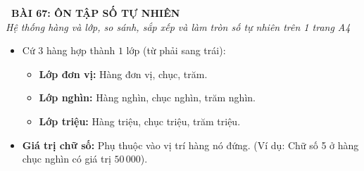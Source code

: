 \documentclass[14pt,a4paper,oneside]{extbook}
\begin{document}
\noindent
\begin{tcolorbox}[
  enhanced,
  colback=teal!8!white,
  colframe=teal!80!black,
  arc=3mm, boxrule=1pt,
  left=3mm, right=3mm, top=2mm, bottom=2mm,
  halign=center
]
  {\Large\bfseries\color{teal!90!black}\faBookmark\ BÀI 67: ÔN TẬP SỐ TỰ NHIÊN}\\[1.5pt]
  {\footnotesize\itshape\color{black!75} Hệ thống hàng và lớp, so sánh, sắp xếp và làm tròn số tự nhiên trên 1 trang A4}
\end{tcolorbox}

\vspace{-2.5mm}

\noindent
\begin{minipage}[t]{0.49\textwidth}\vspace{0pt}
\begin{tcolorbox}[
  enhanced,
  colback=blue!4!white,
  colframe=blue!75!black,
  arc=2mm, boxrule=0.8pt,
  left=2mm, right=2mm, top=1.8mm, bottom=1.8mm,
  title={\footnotesize\bfseries\color{white}\faDatabase\ 1. Cấu tạo số, Hàng và Lớp}
]
{\footnotesize
\begin{itemize}\setlength{\itemsep}{1pt}\setlength{\leftskip}{-2.5mm}
  \item Cứ $3$ hàng hợp thành $1$ lớp (từ phải sang trái):
  \begin{itemize}\setlength{\itemsep}{0.5pt}\setlength{\leftskip}{-2.5mm}
    \item \textbf{Lớp đơn vị:} Hàng đơn vị, chục, trăm.
    \item \textbf{Lớp nghìn:} Hàng nghìn, chục nghìn, trăm nghìn.
    \item \textbf{Lớp triệu:} Hàng triệu, chục triệu, trăm triệu.
  \end{itemize}
  \item \textbf{Giá trị chữ số:} Phụ thuộc vào vị trí hàng nó đứng. (Ví dụ: Chữ số 5 ở hàng chục nghìn có giá trị $50\,000$).
\end{itemize}
}
\end{tcolorbox}
\end{minipage}
\hfill
\end{document}
